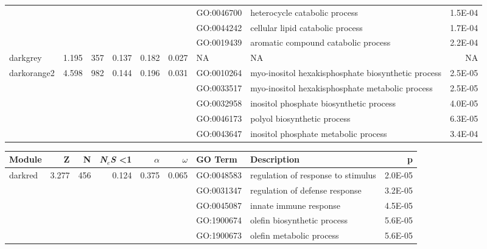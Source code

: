 \begin{landscape}
\begin{table}[ht]
\begin{tabular}{lrrrrrlP{5cm}r}
   &  &  &  &  &  & GO:0046700 & heterocycle catabolic process & 1.5E-04 \\ 
   &  &  &  &  &  & GO:0044242 & cellular lipid catabolic process & 1.7E-04 \\ 
   &  &  &  &  &  & GO:0019439 & aromatic compound catabolic process & 2.2E-04 \\ 
\hline 
 darkgrey & 1.195 & 357 & 0.137 & 0.182 & 0.027 &  NA &  NA & NA \\ 
\hline
  darkorange2 & 4.598 & 982 & 0.144 & 0.196 & 0.031 & GO:0010264 & myo-inositol hexakisphosphate biosynthetic process & 2.5E-05 \\ 
   &  &  &  &  &  & GO:0033517 & myo-inositol hexakisphosphate metabolic process & 2.5E-05 \\ 
   &  &  &  &  &  & GO:0032958 & inositol phosphate biosynthetic process & 4.0E-05 \\ 
   &  &  &  &  &  & GO:0046173 & polyol biosynthetic process & 6.3E-05 \\ 
   &  &  &  &  &  & GO:0043647 & inositol phosphate metabolic process & 3.4E-04 \\ 
\hline
\end{tabular}
\end{table}


\begin{table}[ht]
\centering
\begin{tabular}{lrrrrrlP{5cm}r}
  \hline
Module & Z & N & \textit{N$_{e}$S} \textless 1& $\alpha$ & $\omega$ & GO Term & Description & p \\ 
  \hline
  darkred & 3.277 & 456 & 0.124 & 0.375 & 0.065 & GO:0048583 & regulation of response to stimulus & 2.0E-05 \\ 
   &  &  &  &  &  & GO:0031347 & regulation of defense response & 3.2E-05 \\ 
   &  &  &  &  &  & GO:0045087 & innate immune response & 4.5E-05 \\ 
   &  &  &  &  &  & GO:1900674 & olefin biosynthetic process & 5.6E-05 \\ 
   &  &  &  &  &  & GO:1900673 & olefin metabolic process & 5.6E-05 \\ 
\hline


\end{tabular}
\end{table}
\end{landscape}
